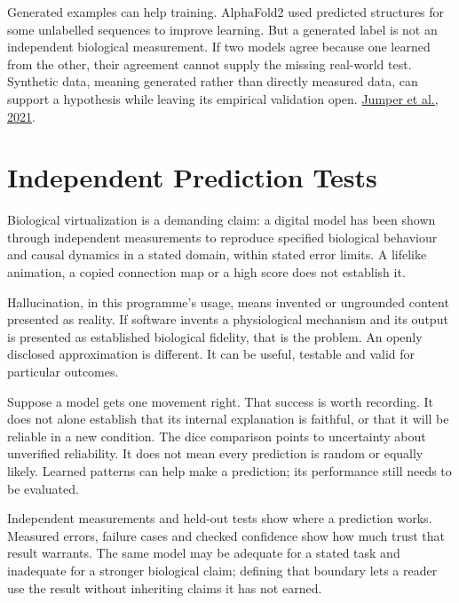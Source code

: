 Generated examples can help training. AlphaFold2 used predicted structures for some unlabelled sequences to improve learning. But a generated label is not an independent biological measurement. If two models agree because one learned from the other, their agreement cannot supply the missing real-world test. Synthetic data, meaning generated rather than directly measured data, can support a hypothesis while leaving its empirical validation open. \href{https://www.nature.com/articles/s41586-021-03819-2}{Jumper et al., 2021}.\par

\section{Independent Prediction Tests}

Biological virtualization is a demanding claim: a digital model has been shown through independent measurements to reproduce specified biological behaviour and causal dynamics in a stated domain, within stated error limits. A lifelike animation, a copied connection map or a high score does not establish it.\par

Hallucination, in this programme's usage, means invented or ungrounded content presented as reality. If software invents a physiological mechanism and its output is presented as established biological fidelity, that is the problem. An openly disclosed approximation is different. It can be useful, testable and valid for particular outcomes.\par

Suppose a model gets one movement right. That success is worth recording. It does not alone establish that its internal explanation is faithful, or that it will be reliable in a new condition. The dice comparison points to uncertainty about unverified reliability. It does not mean every prediction is random or equally likely. Learned patterns can help make a prediction; its performance still needs to be evaluated.\par

Independent measurements and held-out tests show where a prediction works. Measured errors, failure cases and checked confidence show how much trust that result warrants. The same model may be adequate for a stated task and inadequate for a stronger biological claim; defining that boundary lets a reader use the result without inheriting claims it has not earned.\par

